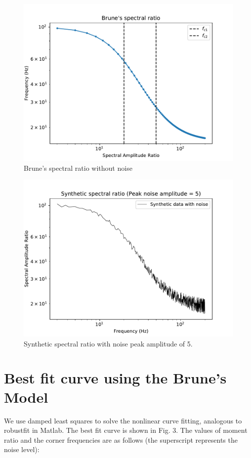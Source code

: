 \documentclass[11pt]{article}
\begin{document}
\begin{figure}[!htb]
    \centering
    \includegraphics[scale=0.7]{fig1.pdf}
    \caption{Brune's spectral ratio without noise}
\end{figure}
\begin{figure}[!htb]
    \centering
    \includegraphics[scale=0.7]{fig_noise_1.pdf}
    \caption{Synthetic spectral ratio with noise peak amplitude of 5.}
\end{figure}
\clearpage

\section*{Best fit curve using the Brune's Model}
We use damped least squares to solve the nonlinear curve fitting, analogous to robustfit in Matlab. The best fit curve is shown in Fig. 3. The values of moment ratio and the corner frequencies are as follows (the superscript represents the noise level):
\end{document}
